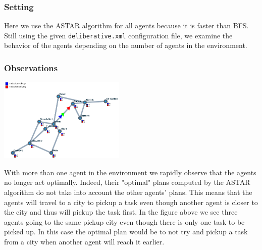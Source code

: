 \documentclass[11pt]{article}
\begin{document}
\subsubsection{Setting}
Here we use the ASTAR algorithm for all agents because it is faster than 
BFS. Still using the given \texttt{deliberative.xml} configuration file, 
we examine the behavior of the agents depending on the number of agents in the environment.

\subsubsection{Observations}
\begin{center}
\includegraphics[width=6cm]{follow.png}
\end{center}
With more than one agent in the environment we rapidly observe that the 
agents no longer act optimally. Indeed, their "optimal" plans computed by 
the ASTAR algorithm do not take into account the other agents' plans. 
This means that the agents will travel to a city to pickup a task even though 
another agent is closer to the city and thus will pickup the task first. 
In the figure above we see three agents going to the same pickup city even 
though there is only one task to be picked up. 
In this case the optimal plan would be to not try and pickup a task from a city 
when another agent will reach it earlier. 
\end{document}
